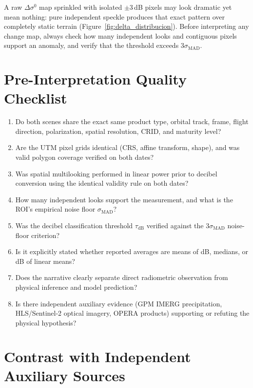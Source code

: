 \documentclass[11pt,a4paper]{article}
\begin{document}
\begin{atencion}
A raw $\Delta\sigma^0$ map sprinkled with isolated $\pm3$\,dB pixels may look dramatic yet mean nothing: pure independent speckle produces that exact pattern over completely static terrain (Figure~\ref{fig:delta_distribucion}). Before interpreting any change map, always check how many independent looks and contiguous pixels support an anomaly, and verify that the threshold exceeds $3\sigma_{\mathrm{MAD}}$.
\end{atencion}

\section{Pre-Interpretation Quality Checklist}
\label{sec:checklist-radar}

\begin{enumerate}
  \item Do both scenes share the exact same product type, orbital track, frame, flight direction, polarization, spatial resolution, CRID, and maturity level?
  \item Are the UTM pixel grids identical (CRS, affine transform, shape), and was valid polygon coverage verified on both dates?
  \item Was spatial multilooking performed in linear power prior to decibel conversion using the identical validity rule on both dates?
  \item How many independent looks support the measurement, and what is the ROI's empirical noise floor $\sigma_{\mathrm{MAD}}$?
  \item Was the decibel classification threshold $\tau_{\mathrm{dB}}$ verified against the $3\sigma_{\mathrm{MAD}}$ noise-floor criterion?
  \item Is it explicitly stated whether reported averages are means of dB, medians, or dB of linear means?
  \item Does the narrative clearly separate direct radiometric observation from physical inference and model prediction?
  \item Is there independent auxiliary evidence (GPM IMERG precipitation, HLS/Sentinel-2 optical imagery, OPERA products) supporting or refuting the physical hypothesis?
\end{enumerate}

\section{Contrast with Independent Auxiliary Sources}
\label{sec:contraste}
\end{document}
